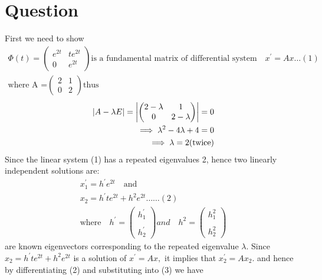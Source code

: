 \documentclass[a4paper, 12pt]{article}
\begin{document}
\section{Question}
First we need to show \\
\begin{align*}
\varPhi (t) =
\begin{pmatrix}
e^{2t} & te^{2t} \\
0 & e^{2t}
\end{pmatrix} 
\text{is a fundamental matrix of differential system} \quad x^\prime = Ax \ldots (1)  \\
\text{where A =} 
\begin{pmatrix}
2 & 1\\
0 & 2
\end{pmatrix} \text{thus}
\end{align*}
\begin{eqnarray}
\nonumber \arrowvert A - \lambda E \arrowvert = 
\left|
\begin{pmatrix} 
2-\lambda & 1 \\
0 & 2- \lambda
\end{pmatrix} \right| = 0 \\
\nonumber \implies \lambda ^2 - 4 \lambda + 4 = 0 \\
\nonumber \implies \lambda = 2 \text{(twice)}
\end{eqnarray}
Since the linear system (1) has a repeated eigenvalues 2, hence two linearly independent solutions are:\\
\begin{align*}
x_{1}^\prime = h^\prime e^{2t} \quad \text{and}\\
x_{2} = h^\prime te^{2t} + h^2e^{2t} \ldots \ldots (2)\\
\text{where} \quad h^\prime = \begin{pmatrix}
h_1^\prime \\~\\
h_2^\prime
\end{pmatrix} and \quad h^2 = \begin{pmatrix}
h_1^2\\~\\
h_2^2
\end{pmatrix}
\end{align*}
are known eigenvectors corresponding to the repeated eigenvalue $ \lambda $.
Since $ x_2 = h^\prime te^{2t} + h^2e^{2t} $ is a solution of $ x^\prime = Ax, $ it implies that $ x_2^\prime = Ax_2$. and hence by differentiating (2) and substituting into (3) we have \\
\end{document}
